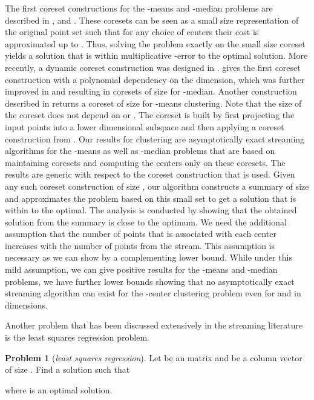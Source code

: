 \documentclass[a4paper,11pt,oneside,english,onecolumn]{article}
\theoremstyle{definition}
\newtheorem{problem}{Problem}
\begin{document}
The first coreset constructions for the -means and -median problems are described in \cite{FirstCoreset}, \cite{HPClustering} and \cite{SmallerCoresets}. These coresets can be seen as a small size representation of the original point set such that for any choice of centers their cost is approximated up to . Thus, solving the problem exactly on the small size coreset yields a solution that is within multiplicative -error to the optimal solution. More recently, a dynamic coreset construction was designed in \cite{DynamicCoreset}. \cite{PolyCoreset} gives the first coreset construction with a polynomial dependency on the dimension, which was further improved in \cite{ImproveCoreset1} and \cite{Feldman} resulting in coresets of size  for -median. Another construction described in \cite{TinyData} returns a coreset of size  for -means clustering. Note that the size of the coreset does not depend on  or . The coreset is built by first projecting the input points into a lower dimensional subspace and then applying a coreset construction from \cite{Feldman}.
Our results for clustering are asymptotically exact streaming algorithms for the -means as well as -median problems that are based on maintaining coresets and computing the centers only on these coresets. The results are generic with respect to the coreset construction that is used. Given any such coreset construction of size , our algorithm constructs a summary of size  and approximates the problem based on this small set to get a solution that is within  to the optimal. 
The analysis is conducted by showing that the obtained solution from the summary is close to the optimum. We need the additional assumption that the number of points that is associated with each center increases with the number of points from the stream. This assumption is necessary as we can show by a complementing lower bound. While under this mild assumption, we can give positive results for the -means and -median problems, we have further lower bounds showing that no asymptotically exact streaming algorithm can exist for the -center clustering problem even for  and in  dimensions.

Another problem that has been discussed extensively in the streaming literature is the least squares regression problem.
\begin{problem}[\emph{least squares regression}]
Let  be an  matrix and  be a column vector of size . Find a solution  such that

where  is an optimal solution.
\end{problem}
\end{document}
